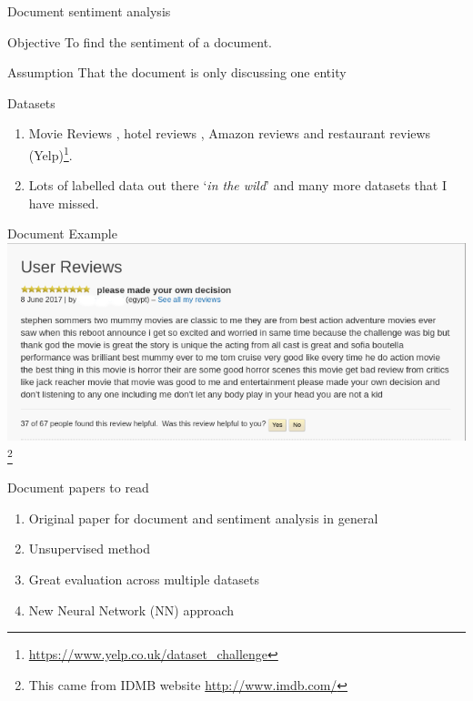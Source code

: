 \documentclass[10pt]{beamer}
\begin{document}
\begin{frame}[fragile]{Document sentiment analysis}
  \begin{block}{Objective}
  	To find the sentiment of a document.
  \end{block}
  \begin{block}{Assumption}
    That the document is only discussing one entity
  \end{block}
  \begin{block}{Datasets}
    \begin{enumerate}
      \item Movie Reviews \cite{pang2002,PangSubj04,mass2011}, hotel reviews \cite{wang10}, Amazon reviews \cite{Blitzer07,he16} and restaurant reviews (Yelp)\footnote{\url{https://www.yelp.co.uk/dataset_challenge}}.
      \item Lots of labelled data out there `\textit{in the wild}' and many more datasets that I have missed.
    \end{enumerate}
  \end{block}
\end{frame}

\begin{frame}{Document Example}
  \centering
  \includegraphics[scale=0.45]{examples/mummy_review.png}\footnote{This came from IDMB website \url{http://www.imdb.com/}}
\end{frame}

\begin{frame}{Document papers to read}
  \huge 
  \begin{enumerate}
    \item Original paper for document and sentiment analysis in general \cite{pang2002}
    \item Unsupervised method \cite{Turney02}
    \item Great evaluation across multiple datasets \cite{Paltoglou10}
    \item New Neural Network (NN) approach \cite{Xu16}
  \end{enumerate}

\end{frame}
\end{document}
